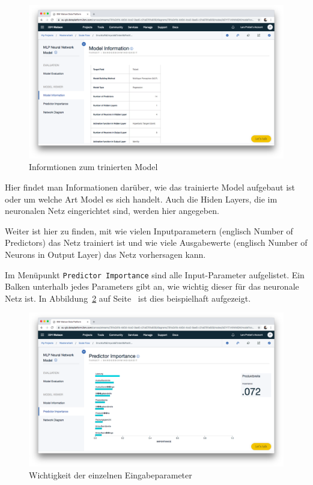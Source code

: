 \begin{figure}[h]
    \centering
    \includegraphics[width=\textwidth]{images/kapitel_3/model_information.png}
    \caption{Informtionen zum trinierten Model}
    \label{fig:umsetzung_model_information}
\end{figure}

Hier findet man Informationen darüber, wie das trainierte Model aufgebaut ist oder um welche Art Model es sich handelt.
Auch die Hiden Layers, die im neuronalen Netz eingerichtet sind, werden hier angegeben.

Weiter ist hier zu finden, mit wie vielen Inputparametern (englisch Number of Predictors) das Netz trainiert ist und wie
viele Ausgabewerte (englisch Number of Neurons in Output Layer) das Netz vorhersagen kann.

Im Menüpunkt \texttt{Predictor Importance} sind alle Input-Parameter aufgelistet. Ein Balken unterhalb jedes Parameters
gibt an, wie wichtig dieser für das neuronale Netz ist. In Abbildung~\ref{fig:umsetzung_model_predictor} auf
Seite~\pageref{fig:umsetzung_model_predictor} ist dies beispielhaft aufgezeigt.

\begin{figure}[h]
    \centering
    \includegraphics[width=\textwidth]{images/kapitel_3/model_predictor.png}
    \caption{Wichtigkeit der einzelnen Eingabeparameter}
    \label{fig:umsetzung_model_predictor}
\end{figure}

